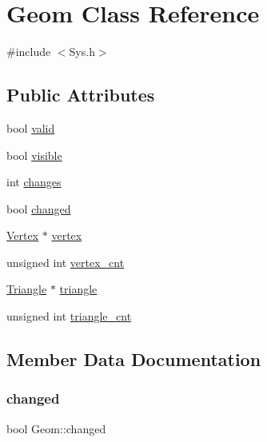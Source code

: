 \hypertarget{classGeom}{}\section{Geom Class Reference}
\label{classGeom}


{\ttfamily \#include $<$Sys.\+h$>$}

\subsection*{Public Attributes}
\begin{DoxyCompactItemize}
\item 
bool \mbox{\hyperlink{classGeom_af9138a6bc990f25047628ae98f5b046b}{valid}}
\item 
bool \mbox{\hyperlink{classGeom_adc882cd899f86361652f9e09a9b3a24b}{visible}}
\item 
int \mbox{\hyperlink{classGeom_af308428ba68c7924e89b897fe933aeff}{changes}}
\item 
bool \mbox{\hyperlink{classGeom_a7c520345e719b6f6ef6d16e519756431}{changed}}
\item 
\mbox{\hyperlink{classVertex}{Vertex}} $\ast$ \mbox{\hyperlink{classGeom_aa8055dccc75eedf0e2deba480de436b5}{vertex}}
\item 
unsigned int \mbox{\hyperlink{classGeom_a09fea2875dcccf7bd2f8718e0042bb79}{vertex\+\_\+cnt}}
\item 
\mbox{\hyperlink{classTriangle}{Triangle}} $\ast$ \mbox{\hyperlink{classGeom_aac8b2ba568b8b7314ddb71ab0e6e2fa5}{triangle}}
\item 
unsigned int \mbox{\hyperlink{classGeom_a0b3ce13d56b95ba36f8728279c5147a9}{triangle\+\_\+cnt}}
\end{DoxyCompactItemize}


\subsection{Member Data Documentation}
\mbox{\label{classGeom_a7c520345e719b6f6ef6d16e519756431}} 
\subsubsection{\texorpdfstring{changed}{changed}}
{\footnotesize\ttfamily bool Geom\+::changed}

\mbox{\label{classGeom_af308428ba68c7924e89b897fe933aeff}} 
